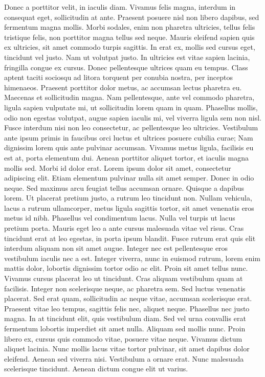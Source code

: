 \documentclass[12pt,a4paper,twoside, twocolumn]{article}
\begin{document}
Donec a porttitor velit, in iaculis diam. Vivamus felis magna, interdum in consequat eget, sollicitudin at ante. Praesent posuere nisl non libero dapibus, sed fermentum magna mollis. Morbi sodales, enim non pharetra ultricies, tellus felis tristique felis, non porttitor magna tellus sed neque. Mauris eleifend sapien quis ex ultricies, sit amet commodo turpis sagittis. In erat ex, mollis sed cursus eget, tincidunt vel justo. Nam ut volutpat justo. In ultricies est vitae sapien lacinia, fringilla congue ex cursus. Donec pellentesque ultrices quam eu tempus. Class aptent taciti sociosqu ad litora torquent per conubia nostra, per inceptos himenaeos. Praesent porttitor dolor metus, ac accumsan lectus pharetra eu. Maecenas et sollicitudin magna. Nam pellentesque, ante vel commodo pharetra, ligula sapien vulputate mi, ut sollicitudin lorem quam in quam. Phasellus mollis, odio non egestas volutpat, augue sapien iaculis mi, vel viverra ligula sem non nisl. 
Fusce interdum nisi non leo consectetur, ac pellentesque leo ultricies. Vestibulum ante ipsum primis in faucibus orci luctus et ultrices posuere cubilia curae; Nam dignissim lorem quis ante pulvinar accumsan. Vivamus metus ligula, facilisis eu est at, porta elementum dui. Aenean porttitor aliquet tortor, et iaculis magna mollis sed. Morbi id dolor erat. Lorem ipsum dolor sit amet, consectetur adipiscing elit. Etiam elementum pulvinar nulla sit amet semper. Donec in odio neque. 
Sed maximus arcu feugiat tellus accumsan ornare. Quisque a dapibus lorem. Ut placerat pretium justo, a rutrum leo tincidunt non. Nullam vehicula, lacus a rutrum ullamcorper, metus ligula sagittis tortor, sit amet venenatis eros metus id nibh. Phasellus vel condimentum lacus. Nulla vel turpis ut lacus pretium porta. Mauris eget leo a ante cursus malesuada vitae vel risus. Cras tincidunt erat at leo egestas, in porta ipsum blandit. Fusce rutrum erat quis elit interdum aliquam non sit amet augue. Integer nec est pellentesque eros vestibulum iaculis nec a est. Integer viverra, nunc in euismod rutrum, lorem enim mattis dolor, lobortis dignissim tortor odio ac elit. Proin sit amet tellus nunc. Vivamus cursus placerat leo ut tincidunt. Cras aliquam vestibulum quam at facilisis. Integer non scelerisque neque, ac pharetra sem. Sed luctus venenatis placerat. 
Sed erat quam, sollicitudin ac neque vitae, accumsan scelerisque erat. Praesent vitae leo tempus, sagittis felis nec, aliquet neque. Phasellus nec justo magna. In at tincidunt elit, quis vestibulum diam. Sed vel urna convallis erat fermentum lobortis imperdiet sit amet nulla. Aliquam sed mollis nunc. Proin libero ex, cursus quis commodo vitae, posuere vitae neque. Vivamus dictum aliquet lacinia. Nunc mollis lacus vitae tortor pulvinar, sit amet dapibus dolor eleifend. Aenean sed viverra nisi. Vestibulum a ornare erat. Nunc malesuada scelerisque tincidunt. Aenean dictum congue elit ut varius. 
\end{document}

